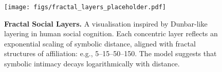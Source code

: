 \begin{figure}[H]
\centering
\texttt{[image: figs/fractal\_layers\_placeholder.pdf]}
\caption{\textbf{Fractal Social Layers.} A visualisation inspired by Dunbar-like layering in human social cognition. Each concentric layer reflects an exponential scaling of symbolic distance, aligned with fractal structures of affiliation: e.g., 5–15–50–150. The model suggests that symbolic intimacy decays logarithmically with distance.}
\end{figure}
